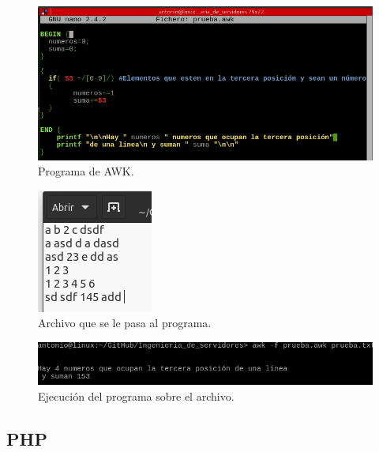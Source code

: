 \begin{figure}[H]
    \begin{center}
    \advance\leftskip-2.2cm
        \includegraphics[scale=0.75]{imagenes/img39}
        \caption{Programa de AWK.}
        \label{fig36}
    \end{center}
\end{figure}

\begin{figure}[H]
    \begin{center}
        \includegraphics[scale=0.8]{imagenes/img40}
        \caption{Archivo que se le pasa al programa.}
        \label{fig37}
    \end{center}
\end{figure}

\begin{figure}[H]
    \begin{center}
    \advance\leftskip-1cm
        \includegraphics[scale=0.7]{imagenes/img41}
        \caption{Ejecución del programa sobre el archivo.}
        \label{fig38}
    \end{center}
\end{figure}




\subsection{PHP}

